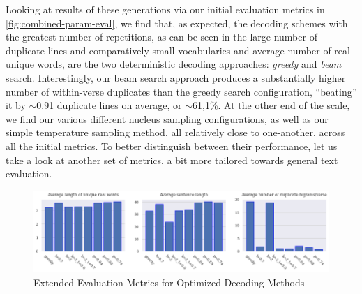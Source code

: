 \begin{table}[H]
    \begin{center}
    \caption{Final Chosen Decoding Schemes}
    \vspace{6pt}
    \bgroup
    \def\arraystretch{1.5}
    \label{tab:chosen-decoding-methods}
    \egroup
    \end{center}
\end{table}

Looking at results of these generations via our initial evaluation metrics in \cref{fig:combined-param-eval}, we find that, as expected, the decoding schemes with the greatest number of repetitions, as can be seen in the large number of duplicate lines and comparatively small vocabularies and average number of real unique words, are the two deterministic decoding approaches: \textit{greedy} and \textit{beam} search. Interestingly, our beam search approach produces a substantially higher number of within-verse duplicates than the greedy search configuration, “beating” it by $\sim$0.91 duplicate lines on average, or $\sim$61,1\%. At the other end of the scale, we find our various different nucleus sampling configurations, as well as our simple temperature sampling method, all relatively close to one-another, across all the initial metrics. To better distinguish between their performance, let us take a look at another set of metrics, a bit more tailored towards general text evaluation.

\begin{figure}[ht!]
    \includegraphics[height=\textheight, width=\textwidth, keepaspectratio=true]{figures/extended_combined_param_eval.png}
    \caption{Extended Evaluation Metrics for Optimized Decoding Methods}
    \label{fig:extended_metrics}
\end{figure}

